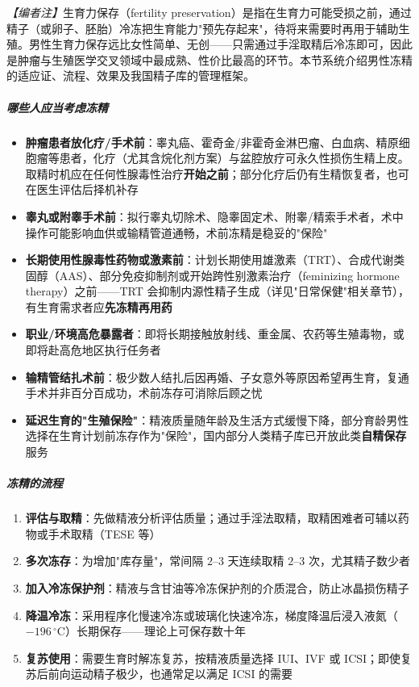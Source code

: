 \noindent\textit{【编者注】}生育力保存（fertility preservation）是指在生育力可能受损之前，通过精子（或卵子、胚胎）冷冻把生育能力"预先存起来"，待将来需要时再用于辅助生殖。男性生育力保存远比女性简单、无创——只需通过手淫取精后冷冻即可，因此是肿瘤与生殖医学交叉领域中最成熟、性价比最高的环节。本节系统介绍男性冻精的适应证、流程、效果及我国精子库的管理框架。

\subparagraph{哪些人应当考虑冻精}

\begin{itemize}
	\item \textbf{肿瘤患者放化疗/手术前}：睾丸癌、霍奇金/非霍奇金淋巴瘤、白血病、精原细胞瘤等患者，化疗（尤其含烷化剂方案）与盆腔放疗可永久性损伤生精上皮。取精时机应在任何性腺毒性治疗\textbf{开始之前}；部分化疗后仍有生精恢复者，也可在医生评估后择机补存
	\item \textbf{睾丸或附睾手术前}：拟行睾丸切除术、隐睾固定术、附睾/精索手术者，术中操作可能影响血供或输精管道通畅，术前冻精是稳妥的"保险"
	\item \textbf{长期使用性腺毒性药物或激素前}：计划长期使用雄激素（TRT）、合成代谢类固醇（AAS）、部分免疫抑制剂或开始跨性别激素治疗（feminizing hormone therapy）之前——TRT 会抑制内源性精子生成（详见"日常保健"相关章节），有生育需求者应\textbf{先冻精再用药}
	\item \textbf{职业/环境高危暴露者}：即将长期接触放射线、重金属、农药等生殖毒物，或即将赴高危地区执行任务者
	\item \textbf{输精管结扎术前}：极少数人结扎后因再婚、子女意外等原因希望再生育，复通手术并非百分百成功，术前冻存可消除后顾之忧
	\item \textbf{延迟生育的"生殖保险"}：精液质量随年龄及生活方式缓慢下降，部分育龄男性选择在生育计划前冻存作为"保险"，国内部分人类精子库已开放此类\textbf{自精保存}服务
\end{itemize}

\subparagraph{冻精的流程}

\begin{enumerate}
	\item \textbf{评估与取精}：先做精液分析评估质量；通过手淫法取精，取精困难者可辅以药物或手术取精（TESE 等）
	\item \textbf{多次冻存}：为增加"库存量"，常间隔 $2$--$3$ 天连续取精 $2$--$3$ 次，尤其精子数少者
	\item \textbf{加入冷冻保护剂}：精液与含甘油等冷冻保护剂的介质混合，防止冰晶损伤精子
	\item \textbf{降温冷冻}：采用程序化慢速冷冻或玻璃化快速冷冻，梯度降温后浸入液氮（$-196\,^{\circ}\mathrm{C}$）长期保存——理论上可保存数十年
	\item \textbf{复苏使用}：需要生育时解冻复苏，按精液质量选择 IUI、IVF 或 ICSI；即使复苏后前向运动精子极少，也通常足以满足 ICSI 的需要
\end{enumerate}

